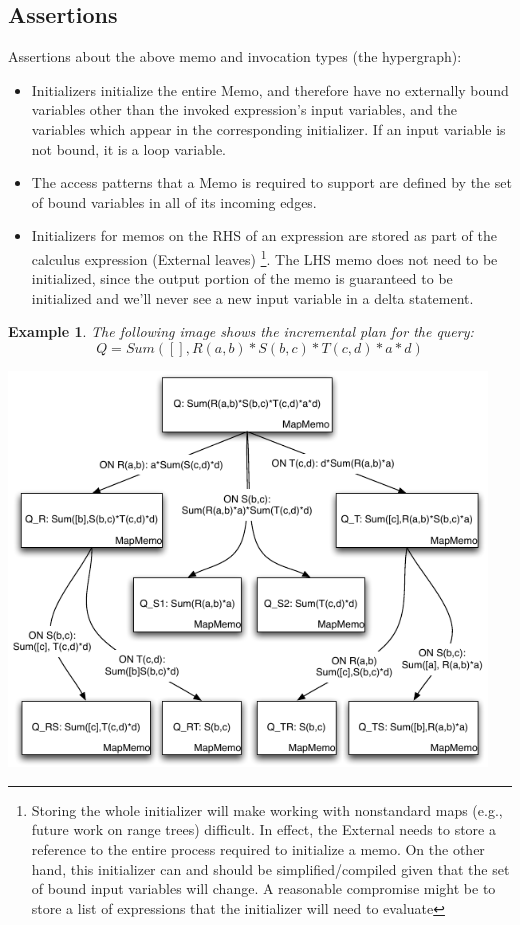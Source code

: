 \documentclass[11pt]{amsart}
\newtheorem{example}{Example}
\begin{document}
\subsection{Assertions}
Assertions about the above memo and invocation types (the hypergraph):
\begin{itemize}
\item Initializers initialize the entire Memo, and therefore have no externally bound variables other than the invoked expression's input variables, and the variables which appear in the corresponding initializer.  If an input variable is not bound, it is a loop variable.

\item The access patterns that a Memo is required to support are defined by the set of bound variables in all of its incoming edges.

\item Initializers for memos on the RHS of an expression are stored as part of the calculus expression (External leaves) \footnote{Storing the whole initializer will make working with nonstandard maps (e.g., future work on range trees) difficult.  In effect, the External needs to store a reference to the entire process required to initialize a memo.  On the other hand, this initializer can and should be simplified/compiled given that the set of bound input variables will change.  A reasonable compromise might be to store a list of expressions that the initializer will need to evaluate}.  The LHS memo does not need to be initialized, since the output portion of the memo is guaranteed to be initialized and we'll never see a new input variable in a delta statement.
\end{itemize}

\begin{example}
The following image shows the incremental plan for the query:
$$Q = Sum([], R(a,b) * S(b,c) * T(c,d) * a * d)$$

\includegraphics[width=5.0in]{IPExample}
\end{example}
\end{document}
